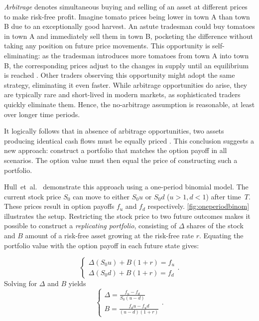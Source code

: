 \documentclass[english,12pt,a4paper,pdftex,sci,utf8]{aaltothesis}
\begin{document}
\emph{Arbitrage} denotes simultaneous buying and selling of an asset at different prices to make risk-free profit. Imagine tomato prices being lower in town A than town B due to an exceptionally good harvest. An astute tradesman could buy tomatoes in town A and immediately sell them in town B, pocketing the difference without taking any position on future price movements. This opportunity is self-eliminating: as the tradesman introduces more tomatoes from town A into town B, the corresponding prices adjust to the changes in supply until an equilibrium is reached \cite{hull2016options, wilmott2013paul}. Other traders observing this opportunity might adopt the same strategy, eliminating it even faster. While arbitrage opportunities do arise, they are typically rare and short-lived in modern markets, as sophisticated traders quickly eliminate them. Hence, the no-arbitrage assumption is reasonable, at least over longer time periods.

It logically follows that in absence of arbitrage opportunities, two assets producing identical cash flows must be equally priced \cite{hull2016options, wilmott2013paul}. This conclusion suggests a new approach: construct a portfolio that matches the option payoff in all scenarios. The option value must then equal the price of constructing such a portfolio.

Hull~et~al.~\cite{hull2013fundamentals} demonstrate this approach using a one-period binomial model. The current stock price $S_0$ can move to either $S_0u$ or $S_0d$ ($u>1,d<1$) after time~$T$. These prices result in option payoffs $f_u$ and $f_d$ respectively. \cref{fig:oneperiodbinom} illustrates the setup. Restricting the stock price to two future outcomes makes it possible to construct a \emph{replicating portfolio}, consisting of $\Delta$ shares of the stock and $B$ amount of a risk-free asset growing at the risk-free rate $r$. Equating the portfolio value with the option payoff in each future state gives:

\begin{equation*}
\begin{cases}
    \Delta (S_0u) + B(1+r) = f_u\\
    \Delta (S_0d) + B(1+r) = f_d
\end{cases}.
\end{equation*}
Solving for $\Delta$ and $B$ yields
\begin{equation*}
\begin{cases}
    \Delta = \frac{f_u - f_d}{S_0(u-d)}\\
    B = \frac{f_du-f_ud}{(u-d)(1+r)}
\end{cases}.
\end{equation*}
\end{document}
